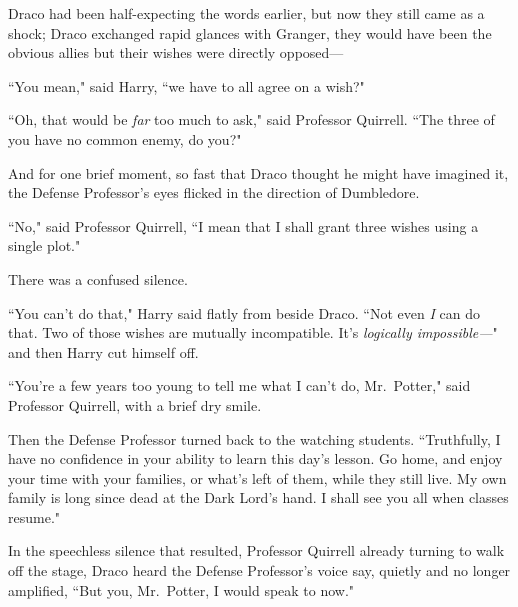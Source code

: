 Draco had been half-expecting the words earlier, but now they still came as a shock; Draco exchanged rapid glances with Granger, they would have been the obvious allies but their wishes were directly opposed---

``You mean," said Harry, ``we have to all agree on a wish?"

``Oh, that would be \emph{far} too much to ask," said Professor Quirrell. ``The three of you have no common enemy, do you?"

And for one brief moment, so fast that Draco thought he might have imagined it, the Defense Professor's eyes flicked in the direction of Dumbledore.

``No," said Professor Quirrell, ``I mean that I shall grant three wishes using a single plot."

There was a confused silence.

``You can't do that," Harry said flatly from beside Draco. ``Not even \emph{I} can do that. Two of those wishes are mutually incompatible. It's \emph{logically impossible---}" and then Harry cut himself off.

``You're a few years too young to tell me what I can't do, Mr.~Potter," said Professor Quirrell, with a brief dry smile.

Then the Defense Professor turned back to the watching students. ``Truthfully, I have no confidence in your ability to learn this day's lesson. Go home, and enjoy your time with your families, or what's left of them, while they still live. My own family is long since dead at the Dark Lord's hand. I shall see you all when classes resume."

In the speechless silence that resulted, Professor Quirrell already turning to walk off the stage, Draco heard the Defense Professor's voice say, quietly and no longer amplified, ``But you, Mr.~Potter, I would speak to now."

